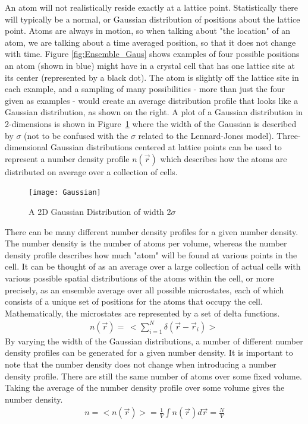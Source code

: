 \documentclass[double,12pt]{beavtex}
\begin{document}
An atom will not realistically reside exactly at a lattice point. 
Statistically there will typically be a normal, or Gaussian distribution 
of positions about the lattice point. 
Atoms are always in motion, so when talking about "the location" 
of an atom, we are talking about a time averaged position, so that it 
does not change with time.
Figure \ref{fig:Ensemble_Gaus} shows examples 
of four possible positions an atom (shown in blue) might have in a crystal 
cell that has one lattice site at its center (represented by a black dot). 
The atom is slightly off the lattice site in each example, and 
a sampling of many possibilities - more than just the four given 
as examples - would create an average distribution profile that looks 
like a Gaussian distribution, as shown on the right.
A plot of a Gaussian distribution in 2-dimensions is shown in 
Figure~\ref{fig:Gaus_plot} where the width of the Gaussian is described 
by $\sigma$ (not to be confused with the $\sigma$ related to the 
Lennard-Jones model). 
Three-dimensional Gaussian distributions centered at lattice points can be 
used to represent a number density profile $n(\vec{r})$  which describes 
how the atoms are distributed on average over a collection of cells. 

\begin{figure}
  \centering
  \texttt{[image: Gaussian]}
  \caption{A 2D Gaussian Distribution of width 2$\sigma$}
  \label{fig:Gaus_plot}
\end{figure}  
  
There can be many different number density profiles for a given number
density. The number density is the number of atoms per volume, whereas
the number density profile describes how much "atom" will be found at various 
points in the cell. 
It can be thought of as an average over a large collection of actual cells
with various possible spatial distributions of the atoms within the cell, or
more precisely, as an ensemble average over all possible microstates, 
each of which consists of a unique set of positions for the atoms 
that occupy the cell. Mathematically, the microstates are represented 
by a set of delta functions.
\begin{align}
    n(\vec r)=~<\sum_{i=1}^N\delta(\vec r - \vec r_i)>~
\end{align} 
By varying the width of the Gaussian distributions, a number of different 
number density profiles can be generated for a given number density.
It is important to note that the number density does not change when 
introducing a number density profile.  
There are still the same number of atoms over some fixed volume. 
Taking the average of the number density profile over some volume 
gives the number density. 
\begin{align}
    n=<n(\vec{r})>=\frac{1}{V}\int{n(\vec{r})}{d\vec{r}}=\frac{N}{V}
\end{align}
\end{document}
